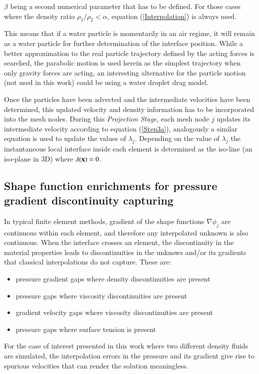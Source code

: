  $\beta$ being a second numerical parameter that has to be defined. For those cases where the density ratio $\rho_1/\rho_2<\alpha$, equation (\ref{Interpolation}) is always used.

This means that if a water particle is momentarily in an air regime, it will remain as a water particle for further determination of the interface position. While a better approximation to the real particle trajectory defined by the acting forces is searched, the parabolic motion is used herein as the simplest trajectory when only gravity forces are acting, an interesting alternative for the particle motion (not used in this work) could be using a water droplet drag model.

Once the particles have been advected and the intermediate velocities have been determined, this updated velocity and density information has to be incorporated into the mesh nodes. During this \textit{Projection Stage}, each mesh node $j$ updates its intermediate velocity according to equation (\ref{Step3a}), analogously a similar equation is used to update the values of $\lambda_j$. Depending on the value of $\lambda_j$ the instantaneous local interface inside each element is determined as the iso-line (an iso-plane in 3D) where $\lambda(\mathbf{x})=0$.

\subsection[Enriched Shape Functions]{Shape function enrichments for pressure gradient discontinuity capturing}

In typical finite element methods, gradient of the shape functions $\nabla\phi_j$ are continuous within each element, and therefore any interpolated unknown is also continuous. When the interface crosses an element, the discontinuity in the material properties leads to discontinuities in the unknows and/or its gradients that classical interpolations do not capture. These are:
\begin{itemize}
\item pressure gradient gaps where density discontinuities are present\cite{Coppola05}
\item pressure gaps where viscosity discontinuities are present\cite{Idelsohn10}
\item gradient velocity gaps where viscosity discontinuities are present
\item pressure gaps where surface tension is present
\end{itemize}
For the case of interest presented in this work where two different density fluids are simulated, the interpolation errors in the pressure and its gradient give rise to spurious velocities that can render the solution meaningless.

